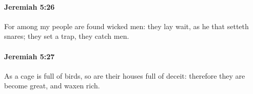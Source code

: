 		\paragraph{Jeremiah 5:26} %
			\label{JEREMIAH-5-26}

			For among my people are found wicked men: they lay wait, as he that setteth snares; they set a trap, they catch men.


		\paragraph{Jeremiah 5:27} %
			\label{JEREMIAH-5-27}

			As a cage is full of birds, so are their houses full of deceit: therefore they are become great, and waxen rich.



